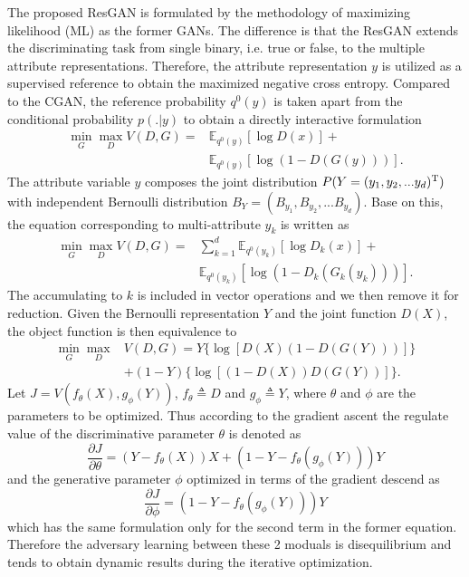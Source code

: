 \documentclass[publish,JACIII,paper]{jaciiiarticle}
\begin{document}
The proposed ResGAN is formulated by the methodology of maximizing likelihood (ML) as the former GANs.
The difference is that the ResGAN extends the discriminating task from single binary, i.e. true or false, to the multiple attribute representations.   
Therefore, the attribute representation $y$ is utilized as a supervised reference to obtain the maximized negative cross entropy.
Compared to the CGAN, the reference probability $q^0(y)$ is taken apart from the conditional probability $p(.|y)$ to obtain a directly interactive formulation
\begin{equation}
 \begin{aligned}
   \min\limits_{G}\max\limits_{D} V(D,G)=&\mathbb E_{q^0(y)}[\log D(x)]+ \\
   &\mathbb E_{q^0(y)}[\log (1 - D(G(y)))].
\end{aligned}
\end{equation}
The attribute variable $y$ composes the joint distribution $P(Y=(y_1,y_2,...y_d)^{\rm T})$ with independent Bernoulli distribution $B_Y=(B_{y_1},B_{y_2},...B_{y_d})$. 
Base on this, the equation corresponding to multi-attribute $y_k$ is written as
\begin{equation}
 \begin{aligned}
   \min\limits_{G}\max\limits_{D} V(D,G)=&\sum_{k=1}^d\mathbb E_{q^0(y_k)}[\log D_k(x)]+ \\
   &\mathbb E_{q^0(y_k)}[\log (1 - D_k(G_k(y_k)))].
\end{aligned}
\end{equation}
The accumulating to $k$ is included in vector operations and we then remove it for reduction. 
Given the Bernoulli representation $Y$ and the joint function $D(X)$, the object function is then equivalence to
\begin{equation}
 \begin{aligned}
   \min\limits_{G}\max\limits_{D} &V(D,G)=Y\{\log [D(X)(1 - D(G(Y)))]\}
   \\&+(1-Y)\{\log [(1-D(X))D(G(Y))]\}.
\end{aligned}
\end{equation}
Let $J=V(f_\theta(X),g_\phi(Y))$, $f_\theta\triangleq D$ and $g_\phi\triangleq Y$, where $\theta$ and $\phi$ are the parameters to be optimized.
Thus according to the gradient ascent the regulate value of the discriminative parameter $\theta$ is denoted as
\begin{equation}
   \frac{\partial J}{\partial\theta}=(Y-f_\theta(X))X+(1-Y-f_\theta(g_\phi(Y)))Y
\end{equation}
and the generative parameter $\phi$ optimized in terms of the gradient descend as 
\begin{equation}
   \frac{\partial J}{\partial\phi}=(1-Y-f_\theta(g_\phi(Y)))Y
\end{equation}
which has the same formulation only for the second term in the former equation. 
Therefore the adversary learning between these 2 moduals is disequilibrium and tends to obtain dynamic results during the iterative optimization.
\end{document}
